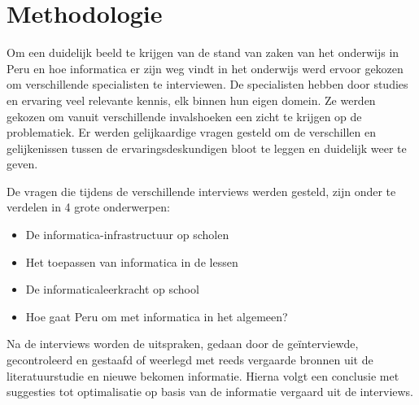
\chapter{Methodologie}
\label{ch:methodologie}


Om een duidelijk beeld te krijgen van de stand van zaken van het onderwijs in Peru en hoe informatica er zijn weg vindt in het onderwijs werd ervoor gekozen om verschillende specialisten te interviewen. De specialisten hebben door studies en ervaring veel relevante kennis, elk binnen hun eigen domein. Ze werden gekozen om vanuit verschillende invalshoeken een zicht te krijgen op de problematiek. Er werden gelijkaardige vragen gesteld om de verschillen en gelijkenissen tussen de ervaringsdeskundigen bloot te leggen en duidelijk weer te geven.

De vragen die tijdens de verschillende interviews werden gesteld, zijn onder te verdelen in 4 grote onderwerpen: 

\begin{itemize}
	\item De informatica-infrastructuur op scholen
	\item Het toepassen van informatica in de lessen
	\item De informaticaleerkracht op school
	\item Hoe gaat Peru om met informatica in het algemeen?
\end{itemize}

Na de interviews worden de uitspraken, gedaan door de geïnterviewde, gecontroleerd en gestaafd of weerlegd met reeds vergaarde bronnen uit de literatuurstudie en nieuwe bekomen informatie. Hierna volgt een conclusie met suggesties tot optimalisatie op basis van de informatie vergaard uit de interviews.

